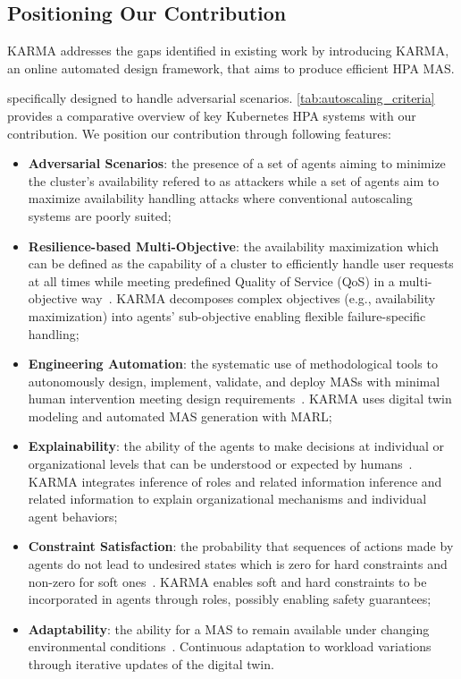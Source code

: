 \documentclass[conference]{IEEEtran}
\begin{document}
\subsection*{Positioning Our Contribution}
KARMA addresses the gaps identified in existing work by introducing KARMA, an online automated design framework, that aims to produce efficient HPA MAS.

specifically designed to handle adversarial scenarios. \autoref{tab:autoscaling_criteria} provides a comparative overview of key Kubernetes HPA systems with our contribution. We position our contribution through following features:
\begin{itemize}
    \item \textbf{Adversarial Scenarios}: the presence of a set of agents aiming to minimize the cluster's availability refered to as attackers while a set of agents aim to maximize availability handling attacks where conventional autoscaling systems are poorly suited;
    \item \textbf{Resilience-based Multi-Objective}: the availability maximization which can be defined as the capability of a cluster to efficiently handle user requests at all times while meeting predefined Quality of Service (QoS) in a multi-objective way~\cite{varghese2019challenges}. KARMA decomposes complex objectives (e.g., availability maximization) into agents' sub-objective enabling flexible failure-specific handling;
    \item \textbf{Engineering Automation}: the systematic use of methodological tools to autonomously design, implement, validate, and deploy MASs with minimal human intervention meeting design requirements~\cite{weyns2020engineering}. KARMA uses digital twin modeling and automated MAS generation with MARL;
    \item \textbf{Explainability}: the ability of the agents to make decisions at individual or organizational levels that can be understood or expected by humans~\cite{Chakraborti2019Explicability}. KARMA integrates inference of roles and related information inference and related information to explain organizational mechanisms and individual agent behaviors; 
    \item \textbf{Constraint Satisfaction}: the probability that sequences of actions made by agents do not lead to undesired states which is zero for hard constraints and non-zero for soft ones~\cite{wooldridge2009introduction}. KARMA enables soft and hard constraints to be incorporated in agents through roles, possibly enabling safety guarantees;
    \item \textbf{Adaptability}: the ability for a MAS to remain available under changing environmental conditions~\cite{wooldridge2009introduction}. Continuous adaptation to workload variations through iterative updates of the digital twin.
\end{itemize}
\end{document}
